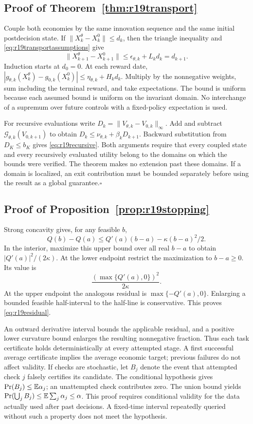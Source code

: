 \subsection{Proof of Theorem~\ref{thm:r19transport}}
Couple both economies by the same innovation sequence and the same initial
postdecision state. If $\|X_k^\theta-X_k^0\|\leq d_k$, then the triangle
inequality and \eqref{eq:r19transportassumptions} give
\[
 \|X_{k+1}^\theta-X_{k+1}^0\|
 \leq\epsilon_{\theta,k}+L_kd_k=d_{k+1}.
\]
Induction starts at $d_0=0$. At each reward date,
$|g_{\theta,k}(X_k^\theta)-g_{0,k}(X_k^0)|
 \leq\eta_{\theta,k}+H_kd_k$.
Multiply by the nonnegative weights, sum including the terminal reward,
and take expectations. The bound is uniform because each assumed bound is
uniform on the invariant domain. No interchange of a supremum over future
controls with a fixed-policy expectation is used.

For recursive evaluations write
$D_k=\|V_{\theta,k}-V_{0,k}\|_\infty$. Add and subtract
$\mathcal G_{\theta,k}(V_{0,k+1})$ to obtain
$D_k\leq\nu_{\theta,k}+\beta_kD_{k+1}$.
Backward substitution from $D_K\leq b_K$ gives
\eqref{eq:r19recursive}. Both arguments require that every coupled state
and every recursively evaluated utility belong to the domains on which the
bounds were verified. The theorem makes no extension past these domains.
If a domain is localized, an exit contribution must be bounded separately
before using the result as a global guarantee.\hfill$\square$

\subsection{Proof of Proposition~\ref{prop:r19stopping}}
Strong concavity gives, for any feasible $b$,
\[
 Q(b)-Q(a)\leq Q'(a)(b-a)-\kappa(b-a)^2/2.
\]
In the interior, maximize this upper bound over all real $b-a$ to obtain
$|Q'(a)|^2/(2\kappa)$. At the lower endpoint restrict the maximization to $b-a\geq0$.
Its value is
\[
 \frac{(\max\{Q'(a),0\})^2}{2\kappa}.
\]
At the upper endpoint the analogous residual is $\max\{-Q'(a),0\}$. Enlarging a bounded
feasible half-interval to the half-line is conservative. This proves
\eqref{eq:r19residual}.

An outward derivative interval bounds the applicable residual, and a positive
lower curvature bound enlarges the resulting nonnegative fraction. Thus each
task certificate holds deterministically at every attempted stage. A first
successful average certificate implies the average economic target; previous
failures do not affect validity. If checks are stochastic, let $B_j$ denote
the event that attempted check $j$ falsely certifies its candidate. The
conditional hypothesis gives $\Pr(B_j)\leq\mathbb E\alpha_j$; an unattempted
check contributes zero. The union bound yields
$\Pr(\bigcup_jB_j)\leq\mathbb E\sum_j\alpha_j\leq\alpha$. This proof requires
conditional validity for the data actually used after past decisions.
A fixed-time interval repeatedly queried without such a property does not
meet the hypothesis.

